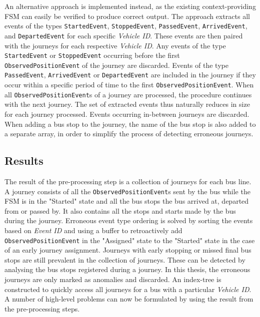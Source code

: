 An alternative approach is implemented instead, as the existing context-providing FSM can easily be verified to produce correct output.
The approach extracts all events of the types \texttt{StartedEvent}, \texttt{StoppedEvent}, \texttt{PassedEvent}, \texttt{ArrivedEvent}, and \texttt{DepartedEvent} for each specific \textit{Vehicle ID}.
These events are then paired with the journeys for each respective \textit{Vehicle ID}.
Any events of the type \texttt{StartedEvent} or \texttt{StoppedEvent} occurring before the first \texttt{ObservedPositionEvent} of the journey are discarded.
Events of the type \texttt{PassedEvent}, \texttt{ArrivedEvent} or \texttt{DepartedEvent} are included in the journey if they occur within a specific period of time to the first \texttt{ObservedPositionEvent}. 
When all \texttt{ObservedPositionEvent}s of a journey are processed, the procedure continues with the next journey.
The set of extracted events thus naturally reduces in size for each journey processed.
Events occurring in-between journeys are discarded.
When adding a bus stop to the journey, the name of the bus stop is also added to a separate array, in order to simplify the process of detecting erroneous journeys.

\subsection{Results}
The result of the pre-processing step is a collection of journeys for each bus line.
A journey consists of all the \texttt{ObservedPositionEvent}s sent by the bus while the FSM is in the "Started" state and all the bus stops the bus arrived at, departed from or passed by.
It also contains all the stops and starts made by the bus during the journey.
Erroneous event type ordering is solved by sorting the events based on \textit{Event ID} and using a buffer to retroactively add \texttt{ObservedPositionEvent} in the "Assigned" state to the "Started" state in the case of an early journey assignment.
Journeys with early stopping or missed final bus stops are still prevalent in the collection of journeys.
These can be detected by analysing the bus stops registered during a journey.
In this thesis, the erroneous journeys are only marked as anomalies and discarded.
An index-tree is constructed to quickly access all journeys for a bus with a particular \textit{Vehicle ID}.
A number of high-level problems can now be formulated by using the result from the pre-processing steps.

